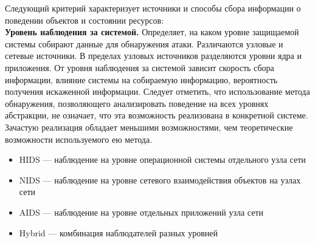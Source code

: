 Следующий критерий характеризует источники и способы сбора информации о поведении объектов и состоянии ресурсов:\\

\textbf{Уровень наблюдения за системой.} Определяет, на каком уровне защищаемой системы собирают данные для обнаружения атаки. Различаются узловые и сетевые источники. В пределах узловых источников разделяются уровни ядра и приложения. От уровня наблюдения за системой зависит скорость сбора информации, влияние системы на собираемую информацию, вероятность получения искаженной информации. Следует отметить, что использование метода обнаружения, позволяющего анализировать поведение на всех уровнях абстракции, не означает, что эта возможность реализована в конкретной системе. Зачастую реализация обладает меньшими возможностями, чем теоретические возможности используемого ею метода. 

\begin{itemize}

\item HIDS --- наблюдение на уровне операционной системы отдельного узла сети
\item NIDS --- наблюдение на уровне сетевого взаимодействия объектов на узлах сети
\item AIDS --- наблюдение на уровне отдельных приложений узла сети
\item Hybrid --- комбинация наблюдателей разных уровней

\end{itemize}

